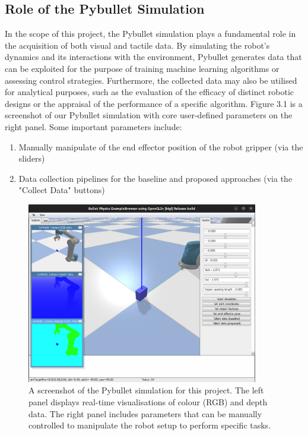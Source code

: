 \documentclass[11pt, a4paper]{report}
\begin{document}
\subsection{Role of the Pybullet Simulation}\label{sec:3.1.1}
In the scope of this project, the Pybullet simulation plays a fundamental role in the acquisition of both visual and tactile data. By simulating the robot's dynamics and its interactions with the environment, Pybullet generates data that can be exploited for the purpose of training machine learning algorithms or assessing control strategies. Furthermore, the collected data may also be utilised for analytical purposes, such as the evaluation of the efficacy of distinct robotic designs or the appraisal of the performance of a specific algorithm. Figure 3.1 is a screenshot of our Pybullet simulation with core user-defined parameters on the right panel. Some important parameters include:
\begin{enumerate}
    \item Manually manipulate of the end effector position of the robot gripper (via the sliders)
    \item Data collection pipelines for the baseline and proposed approaches (via the "Collect Data" buttons)
\end{enumerate}

\begin{figure}[H]
    \centering
    \includegraphics[width=0.9\textwidth]{docs/Project Report/Media/3_1_1_pybullet_sim.png}
    \caption{A screenshot of the Pybullet simulation for this project. The left panel displays real-time visualisations of colour (RGB) and depth data. The right panel includes parameters that can be manually controlled to manipulate the robot setup to perform specific tasks.}
    \label{fig:3.2}
\end{figure}
\end{document}
